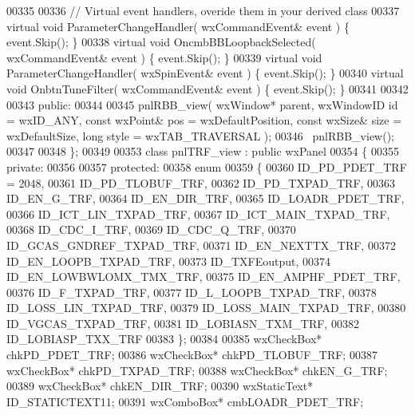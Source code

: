 \begin{DoxyCode}
00335         
00336         \textcolor{comment}{// Virtual event handlers, overide them in your derived class}
00337         \textcolor{keyword}{virtual} \textcolor{keywordtype}{void} ParameterChangeHandler( wxCommandEvent& event ) \{ \textcolor{keyword}{event}.Skip(); \}
00338         \textcolor{keyword}{virtual} \textcolor{keywordtype}{void} OncmbBBLoopbackSelected( wxCommandEvent& event ) \{ \textcolor{keyword}{event}.Skip(); \}
00339         \textcolor{keyword}{virtual} \textcolor{keywordtype}{void} ParameterChangeHandler( wxSpinEvent& event ) \{ \textcolor{keyword}{event}.Skip(); \}
00340         \textcolor{keyword}{virtual} \textcolor{keywordtype}{void} OnbtnTuneFilter( wxCommandEvent& event ) \{ \textcolor{keyword}{event}.Skip(); \}
00341         
00342     
00343     \textcolor{keyword}{public}:
00344         
00345         pnlRBB_view( wxWindow* parent, wxWindowID \textcolor{keywordtype}{id} = wxID\_ANY, \textcolor{keyword}{const} wxPoint& pos = wxDefaultPosition, \textcolor{keyword}{
      const} wxSize& size = wxDefaultSize, \textcolor{keywordtype}{long} style = wxTAB\_TRAVERSAL ); 
00346         ~pnlRBB_view();
00347     
00348 \};
00349 
00353 \textcolor{keyword}{class }pnlTRF_view : \textcolor{keyword}{public} wxPanel 
00354 \{
00355     \textcolor{keyword}{private}:
00356     
00357     \textcolor{keyword}{protected}:
00358         \textcolor{keyword}{enum}
00359         \{
00360             ID\_PD\_PDET\_TRF = 2048,
00361             ID_PD_TLOBUF_TRF,
00362             ID_PD_TXPAD_TRF,
00363             ID_EN_G_TRF,
00364             ID_EN_DIR_TRF,
00365             ID_LOADR_PDET_TRF,
00366             ID_ICT_LIN_TXPAD_TRF,
00367             ID_ICT_MAIN_TXPAD_TRF,
00368             ID_CDC_I_TRF,
00369             ID_CDC_Q_TRF,
00370             ID_GCAS_GNDREF_TXPAD_TRF,
00371             ID_EN_NEXTTX_TRF,
00372             ID_EN_LOOPB_TXPAD_TRF,
00373             ID_TXFEoutput,
00374             ID_EN_LOWBWLOMX_TMX_TRF,
00375             ID_EN_AMPHF_PDET_TRF,
00376             ID_F_TXPAD_TRF,
00377             ID_L_LOOPB_TXPAD_TRF,
00378             ID_LOSS_LIN_TXPAD_TRF,
00379             ID_LOSS_MAIN_TXPAD_TRF,
00380             ID_VGCAS_TXPAD_TRF,
00381             ID_LOBIASN_TXM_TRF,
00382             ID\_LOBIASP\_TXX\_TRF
00383         \};
00384         
00385         wxCheckBox* chkPD_PDET_TRF;
00386         wxCheckBox* chkPD_TLOBUF_TRF;
00387         wxCheckBox* chkPD_TXPAD_TRF;
00388         wxCheckBox* chkEN_G_TRF;
00389         wxCheckBox* chkEN_DIR_TRF;
00390         wxStaticText* ID_STATICTEXT11;
00391         wxComboBox* cmbLOADR_PDET_TRF;

\end{DoxyCode}
